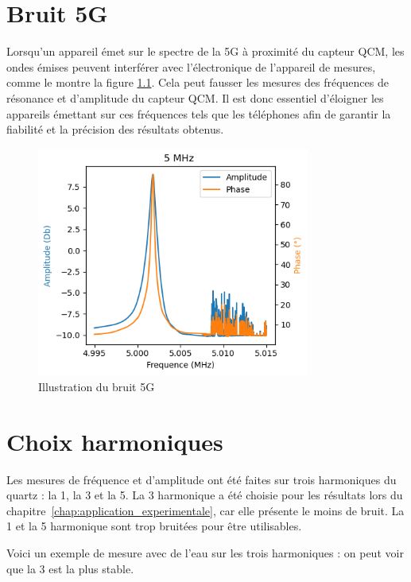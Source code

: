 \chapter{Bruit 5G}

Lorsqu'un appareil émet sur le spectre de la 5G à proximité du capteur QCM, les ondes émises peuvent interférer avec l'électronique de l'appareil de mesures, comme le montre la figure \ref{fig:bruit-5g}.
Cela peut fausser les mesures des fréquences de résonance et d'amplitude du capteur QCM.
Il est donc essentiel d'éloigner les appareils émettant sur ces fréquences tels que les téléphones afin de garantir la fiabilité et la précision des résultats obtenus.

\begin{figure}[H]
    \centering
    \includegraphics[width=0.8\textwidth]{assets/figures/bruit5G.png}
    \caption{Illustration du bruit 5G}
    \label{fig:bruit-5g}
\end{figure}

\chapter{Choix harmoniques}
\label{chap:choix_harmoniques}
Les mesures de fréquence et d'amplitude ont été faites sur trois harmoniques du quartz : la 1, la 3 et la 5.  
La 3 harmonique a été choisie pour les résultats lors du chapitre~\ref{chap:application_experimentale}, car elle présente le moins de bruit.  
La 1 et la 5 harmonique sont trop bruitées pour être utilisables.  

Voici un exemple de mesure avec de l'eau sur les trois harmoniques : on peut voir que la 3 est la plus stable.

